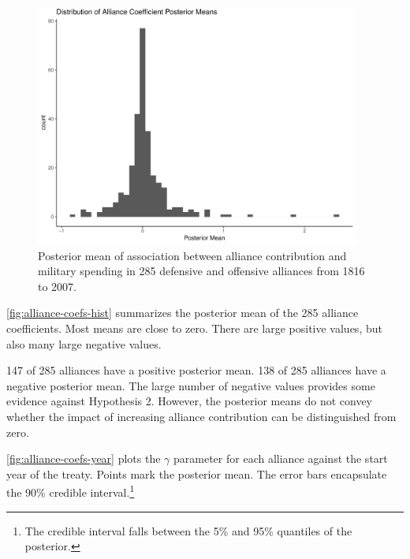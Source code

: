 \documentclass[12pt]{article}
\begin{document}
\begin{figure}[htbp]
	\centering
		\includegraphics[width=0.95\textwidth]{alliance-coefs-hist.pdf}
	\caption{Posterior mean of association between alliance contribution and military spending in 285 defensive and offensive alliances from 1816 to 2007.}
	\label{fig:alliance-coefs-hist}
\end{figure}


\autoref{fig:alliance-coefs-hist} summarizes the posterior mean of the 285 alliance coefficients. 
Most means are close to zero. 
There are large positive values, but also many large negative values.


147 of 285 alliances have a positive posterior mean. 
138 of 285 alliances have a negative posterior mean. 
The large number of negative values provides some evidence against Hypothesis 2. 
However, the posterior means do not convey whether the impact of increasing alliance contribution can be distinguished from zero. 


\autoref{fig:alliance-coefs-year} plots the $\gamma$ parameter for each alliance against the start year of the treaty.
Points mark the posterior mean. 
The error bars encapsulate the 90\% credible interval.\footnote{The credible interval falls between the 5\% and 95\% quantiles of the posterior.}  
\end{document}
